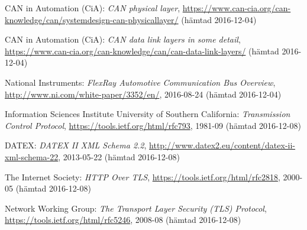 \documentclass[a4paper]{IEEEtran}
\begin{document}
\begin{thebibliography}{77}
	CAN in Automation (CiA): \emph{CAN physical layer},
	\url{https://www.can-cia.org/can-knowledge/can/systemdesign-can-physicallayer/}
	(hämtad 2016-12-04)
	
	CAN in Automation (CiA): \emph{CAN data link layers in some detail},
	\url{https://www.can-cia.org/can-knowledge/can/can-data-link-layers/}
	(hämtad 2016-12-04)
	
	National Instruments: \emph{FlexRay Automotive Communication Bus Overview},
	\url{http://www.ni.com/white-paper/3352/en/},
	2016-08-24 (hämtad 2016-12-04)
	
	Information Sciences Institute	University of Southern California: \emph{Transmission Control Protocol},
	\url{https://tools.ietf.org/html/rfc793},
	1981-09 (hämtad 2016-12-08)
	
	DATEX: \emph{DATEX II XML Schema 2.2},
	\url{http://www.datex2.eu/content/datex-ii-xml-schema-22},
	2013-05-22 (hämtad 2016-12-08)
	
	The Internet Society: \emph{HTTP Over TLS},
	\url{https://tools.ietf.org/html/rfc2818},
	2000-05 (hämtad 2016-12-08)
	
	Network Working Group: \emph{The Transport Layer Security (TLS) Protocol},
	\url{https://tools.ietf.org/html/rfc5246},
	2008-08 (hämtad 2016-12-08)
\end{thebibliography}
\end{document}
